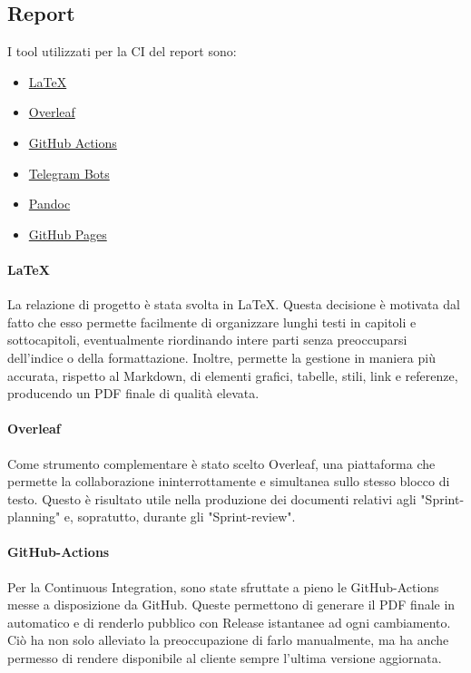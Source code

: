     \subsection{Report}
        I tool utilizzati per la CI del report sono:
        \begin{itemize}
            \item \href{https://www.latex-project.org/}{\LaTeX}
            \item \href{https://www.overleaf.com/}{Overleaf}
            \item \href{https://github.com/features/actions}{GitHub Actions}
            \item \href{https://core.telegram.org/bots/api}{Telegram Bots}
            \item \href{https://pandoc.org/}{Pandoc}
            \item \href{https://pages.github.com/}{GitHub Pages}
        \end{itemize}
        
        \paragraph{\LaTeX}La relazione di progetto è stata svolta in \LaTeX. Questa decisione è motivata dal fatto che esso permette facilmente di organizzare lunghi testi in capitoli e sottocapitoli, eventualmente riordinando intere parti senza preoccuparsi dell'indice o della formattazione. Inoltre, permette la gestione in maniera più accurata, rispetto al Markdown, di elementi grafici, tabelle, stili, link e referenze, producendo un PDF finale di qualità elevata.
        
        \paragraph{Overleaf}
        Come strumento complementare è stato scelto Overleaf, una piattaforma che permette la collaborazione ininterrottamente e simultanea sullo stesso blocco di testo. Questo è risultato utile nella produzione dei documenti relativi agli "Sprint-planning" e, sopratutto, durante gli "Sprint-review".
        
        \paragraph{GitHub-Actions}
        Per la Continuous Integration, sono state sfruttate a pieno le GitHub-Actions messe a disposizione da GitHub. Queste permettono di generare il PDF finale in automatico e di renderlo pubblico con Release istantanee ad ogni cambiamento. Ciò ha non solo alleviato la preoccupazione di farlo manualmente, ma ha anche permesso di rendere disponibile al cliente sempre l'ultima versione aggiornata. 
        
